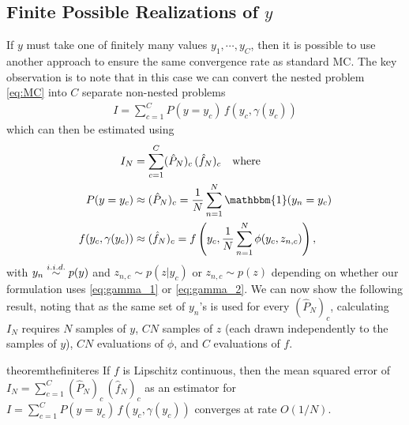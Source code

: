 
\subsection{Finite Possible Realizations of $y$}
\label{sec:discrete}

If $y$ must take one of finitely many values $y_1, \cdots, y_C$, then it is possible to
use another approach to ensure the same convergence rate as standard MC.
The key observation is to note that in this case we can convert the nested problem
\eqref{eq:MC} into $C$ separate non-nested problems
\begin{align}
         I = \sum_{c=1}^C P(y = y_c) \, f(y_c, \gamma(y_c))
\end{align}
which can then be estimated using
\begin{align}
        I_N  &= \sum_{c=1}^C (\hat{P}_N)_c \, (\hat{f}_N)_c \quad \text{where}
        \label{eq:IN} \\
        \label{eq:PN}
        P(y = y_c) &\approx (\hat{P}_N)_c = \frac{1}{N} \sum_{n=1}^N \mathbbm{1}(y_n = y_c)  \\
        \label{eq:fn}
        f(y_c, \gamma(y_c)) &\approx (\hat{f}_N)_c = f\left(y_c, \frac{1}{N} \sum_{n=1}^N \phi(y_c, z_{n,c})\right),
\end{align}
with $y_n \overset{i.i.d.}{\sim} p(y)$ and $z_{n,c} \sim p(z|y_c)$ or $z_{n,c} \sim p(z)$  
depending on whether our formulation uses
\eqref{eq:gamma_1} or \eqref{eq:gamma_2}.  
We can now show the following result, noting that as the same set of $y_n$'s is used for every
$(\hat{P}_N)_c$, calculating $I_N$ requires $N$ samples of $y$, 
$CN$ samples of $z$ (each
drawn independently to the samples of $y$), $CN$ evaluations of $\phi$, and $C$ evaluations of $f$.
\begin{restatable}{theorem}{thefiniteres}
	\label{the:finite-res}
  If $f$ is Lipschitz continuous, then the mean squared error of $I_N  = \sum_{c=1}^C (\hat{P}_N)_c \, (\hat{f}_N)_c$ 
  as an estimator for $I= \sum_{c=1}^C P(y = y_c) \, f(y_c, \gamma(y_c))$ converges at rate $O(1/N)$.
\end{restatable}
%
%
